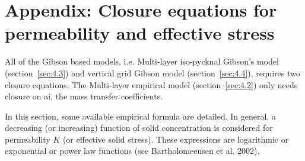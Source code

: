 \section{Appendix: Closure equations for permeability and effective stress}

All of the Gibson based models, i.e. Multi-layer iso-pycknal Gibson's model
(section~\ref{sec:4.3}) and vertical grid Gibson model (section~\ref{sec:4.4}), requires two
closure equations. The Multi-layer empirical model (section~\ref{sec:4.2}) only needs
closure on ai, the mass transfer coefficients.

In this section, some available empirical formula are detailed. In general,
a decreasing (or increasing) function of solid concentration is considered
for permeability $K$ (or effective solid stress). These expressions are
logarithmic or exponential or power law functions (see Bartholomeeusen et
al. 2002).

